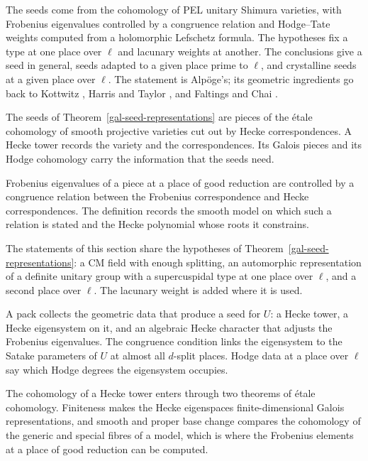 The seeds come from the cohomology of PEL unitary Shimura varieties, with Frobenius eigenvalues
controlled by a congruence relation and Hodge--Tate weights computed from a holomorphic Lefschetz
formula. The hypotheses fix a type at one place over $\ell$ and lacunary weights at another. The
conclusions give a seed in general, seeds adapted to a given place prime to $\ell$, and crystalline
seeds at a given place over $\ell$. The statement is Alp\"oge's; its geometric ingredients go back to
Kottwitz \cite{Kot92}, Harris and Taylor \cite{HT01}, and Faltings and Chai \cite{FC90}.

The seeds of Theorem~\ref{gal-seed-representations} are pieces of the \'etale cohomology of smooth
projective varieties cut out by Hecke correspondences. A Hecke tower records the variety and the
correspondences. Its Galois pieces and its Hodge cohomology carry the information that the seeds
need.

Frobenius eigenvalues of a piece at a place of good reduction are controlled by a congruence relation
between the Frobenius correspondence and Hecke correspondences. The definition records the smooth
model on which such a relation is stated and the Hecke polynomial whose roots it constrains.

The statements of this section share the hypotheses of Theorem~\ref{gal-seed-representations}: a CM
field with enough splitting, an automorphic representation of a definite unitary group with a
supercuspidal type at one place over $\ell$, and a second place over $\ell$. The lacunary weight is
added where it is used.

A pack collects the geometric data that produce a seed for $U$: a Hecke tower, a Hecke eigensystem
on it, and an algebraic Hecke character that adjusts the Frobenius eigenvalues. The congruence
condition links the eigensystem to the Satake parameters of $U$ at almost all $d$-split places. Hodge
data at a place over $\ell$ say which Hodge degrees the eigensystem occupies.

The cohomology of a Hecke tower enters through two theorems of \'etale cohomology. Finiteness makes the
Hecke eigenspaces finite-dimensional Galois representations, and smooth and proper base change
compares the cohomology of the generic and special fibres of a model, which is where the Frobenius
elements at a place of good reduction can be computed.

